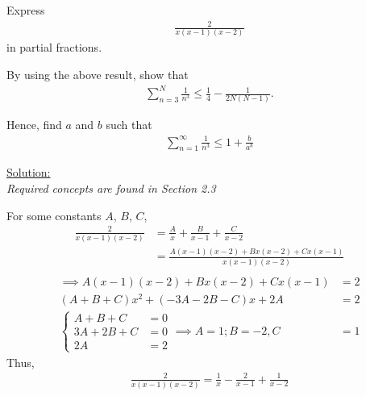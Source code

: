 \documentclass[12pt, a4paper, titlepage]{article}
\begin{document}
Express
\begin{align*}
    \frac{2}{x(x - 1)(x - 2)}
\end{align*}
in partial fractions.

By using the above result, show that
\begin{align*}
    \sum_{n = 3}^N \frac{1}{n^3} \leq \frac{1}{4} - \frac{1}{2N(N - 1)}.
\end{align*}

Hence, find $a$ and $b$ such that
\begin{align*}
    \sum_{n = 1}^\infty \frac{1}{n^3} \leq 1 + \frac{b}{a^b}
\end{align*}

\begin{flushright}
\end{flushright}

\underline{Solution:} \\
\emph{Required concepts are found in Section 2.3}

For some constants $A$, $B$, $C$,
\begin{align*}
    \frac{2}{x(x - 1)(x - 2)} &= \frac{A}{x} + \frac{B}{x - 1} + \frac{C}{x - 2} \\
    &= \frac{A(x - 1)(x - 2) + Bx(x - 2) + Cx(x - 1)}{x(x - 1)(x - 2)} \\
\end{align*}
\begin{align*}
    \implies A(x - 1)(x - 2) + Bx(x - 2) + Cx(x - 1) &= 2 \\
    (A + B + C)x^2 + (-3A -2B - C)x + 2A &= 2 \\
    \begin{cases}
        A + B + C &= 0 \\
        3A + 2B + C &= 0 \\
        2A &= 2
    \end{cases}
    \implies A = 1; B = -2, C &= 1
\end{align*}
Thus,
\begin{align*}
    \frac{2}{x(x - 1)(x - 2)} = \frac{1}{x} - \frac{2}{x - 1} + \frac{1}{x - 2}
\end{align*}
\end{document}
